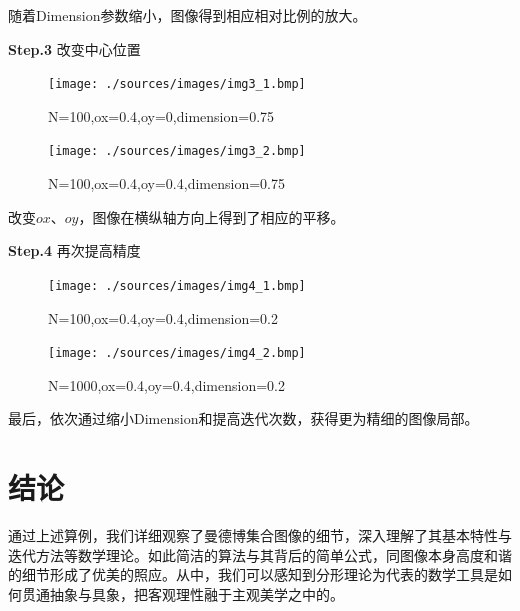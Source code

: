 \documentclass{ctexart}
\begin{document}
随着Dimension参数缩小，图像得到相应相对比例的放大。

\textbf{Step.3} 改变中心位置

\begin{figure}[htb]
\centering
\begin{minipage}{0.48\linewidth}
\centering
\texttt{[image: ./sources/images/img3\_1.bmp]}
\caption{N=100,ox=0.4,oy=0,dimension=0.75}
\end{minipage}\hfill
\begin{minipage}{0.48\linewidth}
\centering
\texttt{[image: ./sources/images/img3\_2.bmp]}
\caption{N=100,ox=0.4,oy=0.4,dimension=0.75}
\end{minipage}
\end{figure}

改变$ox$、$oy$，图像在横纵轴方向上得到了相应的平移。

\textbf{Step.4} 再次提高精度

\begin{figure}[htb]
\centering
\begin{minipage}{0.48\linewidth}
\centering
\texttt{[image: ./sources/images/img4\_1.bmp]}
\caption{N=100,ox=0.4,oy=0.4,dimension=0.2}
\end{minipage}\hfill
\begin{minipage}{0.48\linewidth}
\centering
\texttt{[image: ./sources/images/img4\_2.bmp]}
\caption{N=1000,ox=0.4,oy=0.4,dimension=0.2}
\end{minipage}
\end{figure}

最后，依次通过缩小Dimension和提高迭代次数，获得更为精细的图像局部。

\section{结论}

通过上述算例，我们详细观察了曼德博集合图像的细节，深入理解了其基本特性与迭代方法等数学理论。如此简洁的算法与其背后的简单公式，同图像本身高度和谐的细节形成了优美的照应。从中，我们可以感知到分形理论为代表的数学工具是如何贯通抽象与具象，把客观理性融于主观美学之中的。



\end{document}
